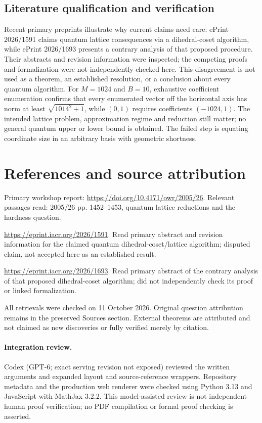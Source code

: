 \documentclass[11pt]{article}
\begin{document}
\subsection{Literature qualification and verification}
Recent primary preprints illustrate why current claims need care: ePrint 2026/1591 claims quantum lattice consequences via a dihedral-coset algorithm, while ePrint 2026/1693 presents a contrary analysis of that proposed procedure. Their abstracts and revision information were inspected; the competing proofs and formalization were not independently checked here. This disagreement is not used as a theorem, an established resolution, or a conclusion about every quantum algorithm.
For $M=1024$ and $B=10$, exhaustive coefficient enumeration confirms that every enumerated vector off the horizontal axis has norm at least $\sqrt{1014^2+1}$, while $(0,1)$ requires coefficients $(-1024,1)$. The intended lattice problem, approximation regime and reduction still matter; no general quantum upper or lower bound is obtained. The failed step is equating coordinate size in an arbitrary basis with geometric shortness.

\section{References and source attribution}
Primary workshop report: \url{https://doi.org/10.4171/owr/2005/26}. Relevant passages read: 2005/26 pp. 1452--1453, quantum lattice reductions and the hardness question.

\url{https://eprint.iacr.org/2026/1591}. Read primary abstract and revision information for the claimed quantum dihedral-coset/lattice algorithm; disputed claim, not accepted here as an established result.

\url{https://eprint.iacr.org/2026/1693}. Read primary abstract of the contrary analysis of that proposed dihedral-coset algorithm; did not independently check its proof or linked formalization.

All retrievals were checked on 11 October 2026. Original question attribution remains in the preserved Sources section. External theorems are attributed and not claimed as new discoveries or fully verified merely by citation.


\paragraph{Integration review.} Codex (GPT-6; exact serving revision not exposed) reviewed the written arguments and expanded layout and source-reference wrappers. Repository metadata and the production web renderer were checked using Python 3.13 and JavaScript with MathJax 3.2.2. This model-assisted review is not independent human proof verification; no PDF compilation or formal proof checking is asserted.
\end{document}
